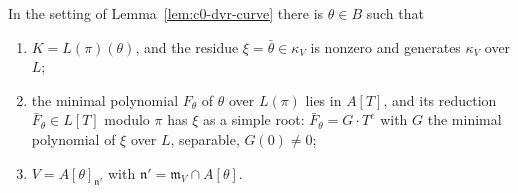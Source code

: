 \begin{lemma}\label{lem:c0-dvr-primitive}
\leanok
{}
In the setting of Lemma~\ref{lem:c0-dvr-curve} there is $\theta\in B$ such that
\begin{enumerate}
\item $K=L(\pi)(\theta)$, and the residue $\xi=\bar\theta\in\kappa_V$ is nonzero and generates $\kappa_V$ over $L$;
\item the minimal polynomial $F_\theta$ of $\theta$ over $L(\pi)$ lies in $A[T]$, and its reduction $\bar F_\theta\in L[T]$ modulo $\pi$
has $\xi$ as a simple root: $\bar F_\theta=G\cdot T^{e}$ with $G$ the minimal polynomial of $\xi$ over $L$, separable, $G(0)\ne0$;
\item $V=A[\theta]_{\mathfrak n'}$ with $\mathfrak n'=\mathfrak m_V\cap A[\theta]$.
\end{enumerate}
\end{lemma}

